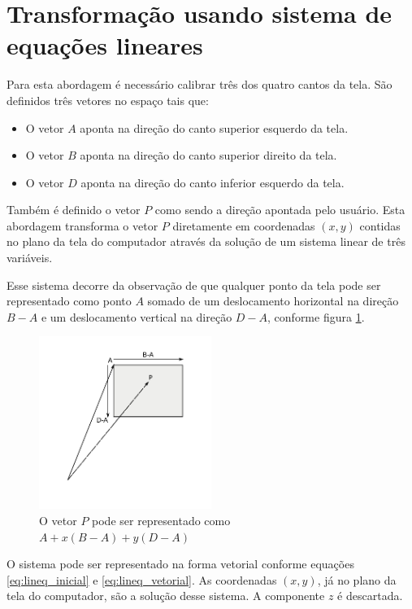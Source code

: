 \documentclass[brazil,pagestart=firstchapter]{abnt}
\begin{document}
\section{Transformação usando sistema de equações lineares}
\label{sec:coord_lineq}

Para esta abordagem é necessário calibrar três dos quatro cantos da tela.
São definidos três vetores no espaço tais que:

\begin{itemize}
\item O vetor $A$ aponta na direção do canto superior esquerdo da tela.
\item O vetor $B$ aponta na direção do canto superior direito da tela.
\item O vetor $D$ aponta na direção do canto inferior esquerdo da tela.
\end{itemize}

Também é definido o vetor $P$ como sendo a direção apontada pelo usuário.
Esta abordagem transforma o vetor $P$ diretamente em coordenadas $(x, y)$
contidas no plano da tela do computador através da solução de um sistema
linear de três variáveis.

Esse sistema decorre da observação de que qualquer ponto da tela pode ser
representado como ponto $A$ somado de um deslocamento horizontal na direção
$B-A$ e um deslocamento vertical na direção $D-A$, conforme figura
\ref{fig:lineq}.

\begin{figure}[h]
\centering
\includegraphics[width=0.5\textwidth]{img/lineq.pdf}
\caption{O vetor $P$ pode ser representado como $A + x(B-A) + y(D-A)$}
\label{fig:lineq}
\end{figure}

O sistema pode ser representado na forma vetorial conforme equações
\eqref{eq:lineq_inicial} e \eqref{eq:lineq_vetorial}. As coordenadas $(x,
y)$, já no plano da tela do computador, são a solução desse sistema. A
componente $z$ é descartada.
\end{document}
